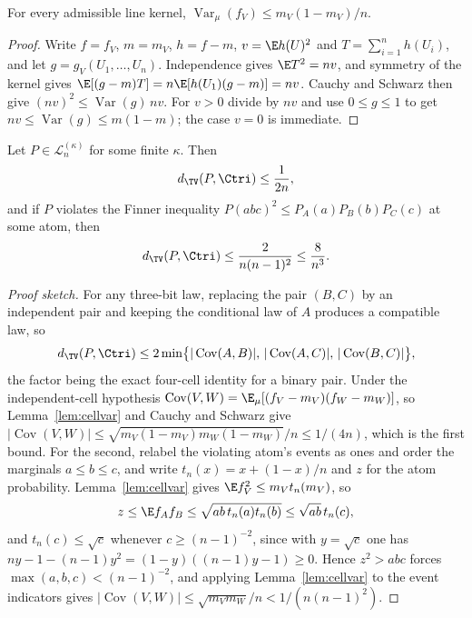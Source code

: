 \begin{lemma}\label{lem:cellvar}
For every admissible line kernel, $\operatorname{Var}_\mu(f_V)\le m_V(1-m_V)/n$.
\end{lemma}

\begin{proof}
Write $f=f_V$, $m=m_V$, $h=f-m$, $v=\E h(U)^2$ and $T=\sum_{i=1}^nh(U_i)$, and let $g=g_V(U_1,\dots,U_n)$. Independence gives $\E T^2=nv$, and symmetry of the kernel gives $\E[(g-m)T]=n\E[h(U_1)(g-m)]=nv$. Cauchy and Schwarz then give $(nv)^2\le\operatorname{Var}(g)\,nv$. For $v>0$ divide by $nv$ and use $0\le g\le1$ to get $nv\le\operatorname{Var}(g)\le m(1-m)$; the case $v=0$ is immediate.
\end{proof}

\begin{proposition}\label{prop:cellceiling}
Let $P\in\mathcal L_n^{(\kappa)}$ for some finite $\kappa$. Then
\[
d_{\TV}(P,\Ctri)\le\frac1{2n},
\]
and if $P$ violates the Finner inequality $P(abc)^2\le P_A(a)P_B(b)P_C(c)$ at some atom, then
\[
d_{\TV}(P,\Ctri)\le\frac2{n(n-1)^2}\le\frac8{n^3}.
\]
\end{proposition}

\begin{proof}[Proof sketch]
For any three-bit law, replacing the pair $(B,C)$ by an independent pair and keeping the conditional law of $A$ produces a compatible law, so
\[
d_{\TV}(P,\Ctri)\le2\min\bigl\{|\operatorname{Cov}(A,B)|,\,|\operatorname{Cov}(A,C)|,\,|\operatorname{Cov}(B,C)|\bigr\},
\]
the factor being the exact four-cell identity for a binary pair. Under the independent-cell hypothesis $\operatorname{Cov}(V,W)=\E_\mu[(f_V-m_V)(f_W-m_W)]$, so Lemma~\ref{lem:cellvar} and Cauchy and Schwarz give $|\operatorname{Cov}(V,W)|\le\sqrt{m_V(1-m_V)m_W(1-m_W)}/n\le1/(4n)$, which is the first bound. For the second, relabel the violating atom's events as ones and order the marginals $a\le b\le c$, and write $t_n(x)=x+(1-x)/n$ and $z$ for the atom probability. Lemma~\ref{lem:cellvar} gives $\E f_V^2\le m_Vt_n(m_V)$, so
\[
z\le\E f_Af_B\le\sqrt{ab\,t_n(a)t_n(b)}\le\sqrt{ab}\,t_n(c),
\]
and $t_n(c)\le\sqrt c$ whenever $c\ge(n-1)^{-2}$, since with $y=\sqrt c$ one has $ny-1-(n-1)y^2=(1-y)((n-1)y-1)\ge0$. Hence $z^2>abc$ forces $\max(a,b,c)<(n-1)^{-2}$, and applying Lemma~\ref{lem:cellvar} to the event indicators gives $|\operatorname{Cov}(V,W)|\le\sqrt{m_Vm_W}/n<1/(n(n-1)^2)$.
\end{proof}

